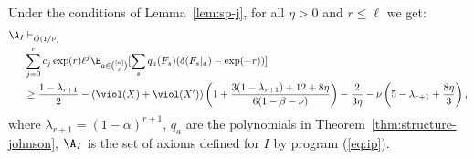 \begin{lemma}\label{lem:structure-fs-j}
Under the conditions of Lemma~\ref{lem:sp-j}, for all $\eta > 0$ and $r \leq \ell$ we get:
\begin{align}
\A_I  
&\vdash_{\tilde{O}(1/\nu)} \\ 
&\sum_{j = 0}^r c_j \exp(r) \ell^j \E_{a \in {[n] \choose j}}[\sum_{s}q_{a}(F_s)(\delta(F_s|_a) - \exp(-r))] \notag\\
&\geq \frac{1 - \lambda_{r+1}}{2} 
- (\viol(X)+\viol(X'))\left(1+\frac{3(1-\lambda_{r+1})+ 12 +8\eta}{6(1-\beta-\nu)}\right) - \frac{2}{3\eta} - \nu\left(5 - \lambda_{r+1} + \frac{8\eta}{3}\right)\label{eq:sp-j-1},
\end{align}
where $\lambda_{r+1} = (1-\alpha)^{r+1}$, $q_a$ are the polynomials in Theorem~\ref{thm:structure-johnson}, $\A_I$ is the set of axioms defined for $I$ by program (\ref{eq:ip}).
\end{lemma}
